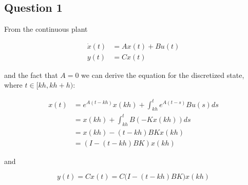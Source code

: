 \subsection{Question 1}

From the continuous plant

\begin{align*}
  \dot{x}(t) &= Ax(t) + Bu(t) \\
        y(t) &= Cx(t)
\end{align*}

and the fact that $A=0$ we can derive the equation for the discretized state,
where $t \in [kh, kh + h)$:

\begin{align*}
  x(t) &= e^{A(t-kh)} x(kh) + \int_{kh}^t e^{A(t-s)} B u(s)ds \\
      ~&= x(kh) + \int_{kh}^t B (-Kx(kh))ds \\
      ~&= x(kh) - (t-kh) B K x(kh) \\
      ~&= (I - (t-kh)BK) x(kh)
\end{align*}

and

\begin{equation}
  y(t) = C x(t) = C \big(I - (t-kh)BK\big) x(kh)
  \label{eq:03.1}
\end{equation}
